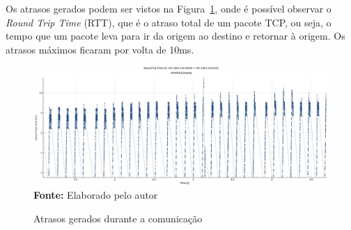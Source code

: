 Os atrasos gerados podem ser vistos na Figura~\ref{fig:delay}, onde é possível observar o \textit{Round Trip Time} (RTT), que é o atraso total de um pacote TCP, ou seja, o tempo que um pacote leva para ir da origem ao destino e retornar à origem. Os atrasos máximos ficaram por volta de 10ms. 

\begin{figure}[ht]
	\caption{Atrasos gerados durante a comunicação}
	\begin{center}
		\includegraphics[scale=0.35]{imagens/delay.jpg}\\
		{\small \textbf{Fonte:} Elaborado pelo autor}
    \end{center}\label{fig:delay}
\end{figure}

